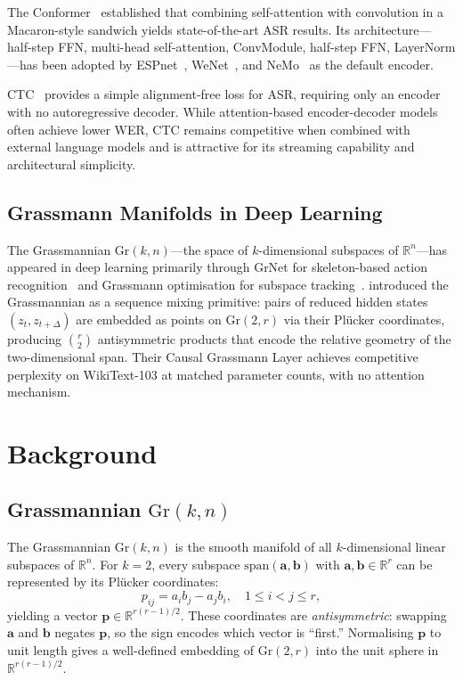 \documentclass[11pt,a4paper]{article}
\newcommand{\Gr}{\mathrm{Gr}}
\newcommand{\R}{\mathbb{R}}
\newcommand{\plucker}{Pl\"{u}cker}
\begin{document}
The Conformer~\citep{gulati2020conformer} established that combining
self-attention with convolution in a Macaron-style sandwich yields
state-of-the-art ASR results.  Its architecture---half-step FFN,
multi-head self-attention, ConvModule, half-step FFN, LayerNorm---has
been adopted by ESPnet~\citep{watanabe2018espnet},
WeNet~\citep{yao2021wenet}, and
NeMo~\citep{kuchaiev2019nemo} as the default encoder.

CTC~\citep{graves2006ctc} provides a simple alignment-free loss for
ASR, requiring only an encoder with no autoregressive decoder.  While
attention-based encoder-decoder models often achieve lower WER, CTC
remains competitive when combined with external language models and is
attractive for its streaming capability and architectural simplicity.

\subsection{Grassmann Manifolds in Deep Learning}

The Grassmannian $\Gr(k,n)$---the space of $k$-dimensional subspaces of
$\R^n$---has appeared in deep learning primarily through GrNet for
skeleton-based action recognition~\citep{huang2018grnet} and
Grassmann optimisation for subspace tracking~\citep{edelman1998geometry}.
\citet{dong2025attention} introduced the Grassmannian as a sequence
mixing primitive: pairs of reduced hidden states $(z_t, z_{t+\Delta})$
are embedded as points on $\Gr(2,r)$ via their \plucker{} coordinates,
producing $\binom{r}{2}$ antisymmetric products that encode the relative
geometry of the two-dimensional span.  Their Causal Grassmann Layer
achieves competitive perplexity on WikiText-103 at matched parameter
counts, with no attention mechanism.

\section{Background}
\label{sec:background}

\subsection{Grassmannian \texorpdfstring{$\Gr(k,n)$}{Gr(k,n)}}

The Grassmannian $\Gr(k,n)$ is the smooth manifold of all
$k$-dimensional linear subspaces of $\R^n$.  For $k=2$, every subspace
$\mathrm{span}(\bm{a}, \bm{b})$ with $\bm{a}, \bm{b} \in \R^r$ can be
represented by its \plucker{} coordinates:
\begin{equation}
  p_{ij} = a_i b_j - a_j b_i, \quad 1 \le i < j \le r,
  \label{eq:plucker}
\end{equation}
yielding a vector $\bm{p} \in \R^{r(r-1)/2}$.  These coordinates are
\emph{antisymmetric}: swapping $\bm{a}$ and $\bm{b}$ negates $\bm{p}$,
so the sign encodes which vector is ``first.''  Normalising $\bm{p}$ to
unit length gives a well-defined embedding of $\Gr(2,r)$ into the unit
sphere in $\R^{r(r-1)/2}$.
\end{document}
